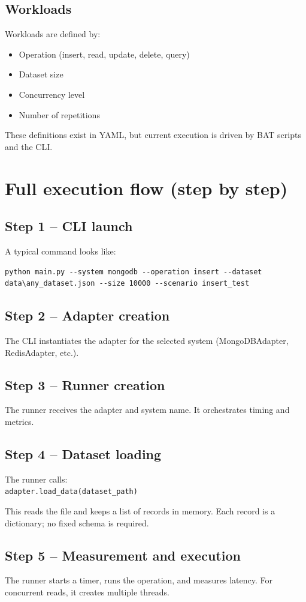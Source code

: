 \documentclass[12pt]{report}
\begin{document}
\section{Workloads}
Workloads are defined by:
\begin{itemize}
  \item Operation (insert, read, update, delete, query)
  \item Dataset size
  \item Concurrency level
  \item Number of repetitions
\end{itemize}
These definitions exist in YAML, but current execution is driven by BAT scripts and the CLI.

\chapter{Full execution flow (step by step)}
\section{Step 1 -- CLI launch}
A typical command looks like:
\begin{verbatim}
python main.py --system mongodb --operation insert --dataset data\any_dataset.json --size 10000 --scenario insert_test
\end{verbatim}

\section{Step 2 -- Adapter creation}
The CLI instantiates the adapter for the selected system (MongoDBAdapter, RedisAdapter, etc.).

\section{Step 3 -- Runner creation}
The runner receives the adapter and system name. It orchestrates timing and metrics.

\section{Step 4 -- Dataset loading}
The runner calls:\\
\texttt{adapter.load\_data(dataset\_path)}

This reads the file and keeps a list of records in memory. Each record is a dictionary; no
fixed schema is required.

\section{Step 5 -- Measurement and execution}
The runner starts a timer, runs the operation, and measures latency. For concurrent reads, it
creates multiple threads.
\end{document}
